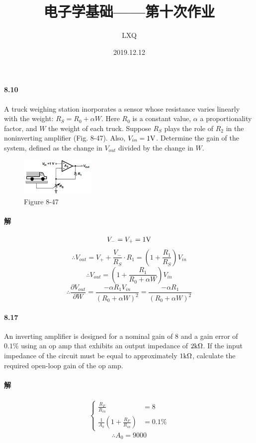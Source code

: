 \documentclass[hyperref, UTF8]{ctexart}
\title{电子学基础——第十次作业}
\author{LXQ}
\date{2019.12.12}
\newcommand{\volt}{{\rm V}}
\newcommand{\kiloohm}{{\rm k}\Omega}
\begin{document}
\maketitle
\paragraph{8.10} \label{8.10}
    A truck weighing station inorporates a sensor whose resistance varies linearly with the weight: $R_S = R_0 + \alpha W$. Here $R_0$ is a constant value, $\alpha$ a proportionality factor, and $W$ the weight of each truck. Suppose $R_S$ plays the role of $R_2$ in the noninverting amplifier (Fig. 8-47). Also, $V_{in} = 1 \volt$. Determine the gain of the system, defined as the change in $V_{out}$ divided by the change in $W$. 

    \begin{figure}[!htb]
        \centering
        \includegraphics[width=0.320\textwidth]{p8-47.png}
        \caption*{Figure 8-47}
    \end{figure}

\paragraph{解}
    $$V_- = V_+ = 1\volt$$
    $$\therefore V_{out} = V_+ + \frac{V_-}{R_S}\cdot R_1 = (1+\frac{R_1}{R_S})V_{in}$$
    $$\therefore V_{out} = (1+\frac{R_1}{R_0 + \alpha W})V_{in}$$
    $$\therefore \frac{\partial V_{out}}{\partial W} = \frac{-\alpha R_1 V_{in}}{(R_0+\alpha W)^2} = \frac{-\alpha R_1}{(R_0+\alpha W)^2}$$

\paragraph{8.17} \label{8.17}
    An inverting amplifier is designed for a nominal gain of $8$ and a gain error of $0.1\%$ using an op amp that exhibits an output impedance of $2\kiloohm$. If the input impedance of the circuit must be equal to approximately $1\kiloohm$, calculate the required open-loop gain of the op amp.

\paragraph{解}
    \begin{gather*}\left\{\begin{aligned}
        \frac{R_F}{R_{in}} & = 8 \\
        \frac{1}{A_0}(1+\frac{R_F}{R_{in}}) & = 0.1 \%
    \end{aligned}\right.\end{gather*}
    $$\therefore A_0 = 9000$$
\end{document}
